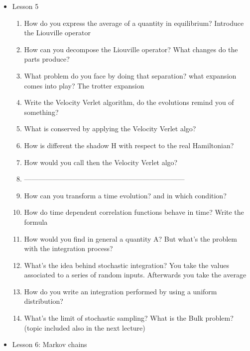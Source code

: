 {\begin{itemize}
\begin{enumerate}
        \item What is the mathematical difference between the two previous integrators?
        \item What is the meaning of symplectic?
        \item What is a unitary matrix what is the case for the Euler-Cromer integrator?
    \end{enumerate}
    \item Lesson 5
    \begin{enumerate}
        \item How do you express the average of a quantity in equilibrium? Introduce the Liouville operator
        \item How can you decompose the Liouville operator? What changes do the parts produce?
        \item What problem do you face by doing that separation? what expansion comes into play? The trotter expansion
        \item Write the Velocity Verlet algorithm, do the evolutions remind you of something?
        \item What is conserved by applying the Velocity Verlet algo?
        \item How is different the shadow H with respect to the real Hamiltonian?
        \item How would you call then the Velocity Verlet algo?
        \item ---------------------------------------------------------------------
        \item How can you transform a time evolution? and in which condition?
        \item How do time dependent correlation functions behave in time? Write the formula
        \item How would you find in general a quantity A? But what's the problem with the integration process?
        \item What's the idea behind stochastic integration? You take the values associated to a series of random inputs. Afterwards you take the average
        \item How do you write an integration performed by using a uniform distribution?
        \item What's the limit of stochastic sampling? What is the Bulk problem? (topic included also in the next lecture)
    \end{enumerate}
    \item Lesson 6: Markov chains
    \begin{enumerate}

\end{enumerate}
\end{itemize}}
